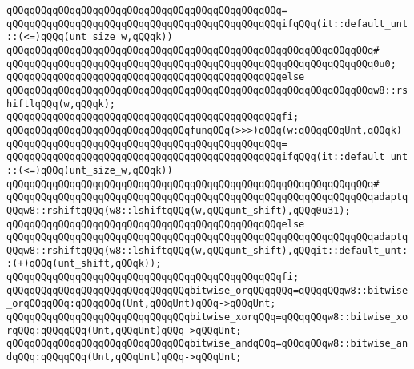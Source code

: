 \verb|qQQqqQQqqQQqqQQqqQQqqQQqqQQqqQQqqQQqqQQqqQQqqQQq=|\newline
\verb|qQQqqQQqqQQqqQQqqQQqqQQqqQQqqQQqqQQqqQQqqQQqqQQqifqQQq(it::default_unt::(<=)qQQq(unt_size_w,qQQqk))|\newline
\verb|qQQqqQQqqQQqqQQqqQQqqQQqqQQqqQQqqQQqqQQqqQQqqQQqqQQqqQQqqQQqqQQq#|\newline
\verb|qQQqqQQqqQQqqQQqqQQqqQQqqQQqqQQqqQQqqQQqqQQqqQQqqQQqqQQqqQQqqQQq0u0;|\newline
\verb|qQQqqQQqqQQqqQQqqQQqqQQqqQQqqQQqqQQqqQQqqQQqqQQqelse|\newline
\verb|qQQqqQQqqQQqqQQqqQQqqQQqqQQqqQQqqQQqqQQqqQQqqQQqqQQqqQQqqQQqqQQqw8::rshiftlqQQq(w,qQQqk);|\newline
\verb|qQQqqQQqqQQqqQQqqQQqqQQqqQQqqQQqqQQqqQQqqQQqqQQqfi;|\newline
\newline
\verb|qQQqqQQqqQQqqQQqqQQqqQQqqQQqqQQqfunqQQq(>>>)qQQq(w:qQQqqQQqUnt,qQQqk)|\newline
\verb|qQQqqQQqqQQqqQQqqQQqqQQqqQQqqQQqqQQqqQQqqQQqqQQq=|\newline
\verb|qQQqqQQqqQQqqQQqqQQqqQQqqQQqqQQqqQQqqQQqqQQqqQQqifqQQq(it::default_unt::(<=)qQQq(unt_size_w,qQQqk))|\newline
\verb|qQQqqQQqqQQqqQQqqQQqqQQqqQQqqQQqqQQqqQQqqQQqqQQqqQQqqQQqqQQqqQQq#|\newline
\verb|qQQqqQQqqQQqqQQqqQQqqQQqqQQqqQQqqQQqqQQqqQQqqQQqqQQqqQQqqQQqqQQqadaptqQQqw8::rshiftqQQq(w8::lshiftqQQq(w,qQQqunt_shift),qQQq0u31);|\newline
\verb|qQQqqQQqqQQqqQQqqQQqqQQqqQQqqQQqqQQqqQQqqQQqqQQqelse|\newline
\verb|qQQqqQQqqQQqqQQqqQQqqQQqqQQqqQQqqQQqqQQqqQQqqQQqqQQqqQQqqQQqqQQqadaptqQQqw8::rshiftqQQq(w8::lshiftqQQq(w,qQQqunt_shift),qQQqit::default_unt::(+)qQQq(unt_shift,qQQqk));|\newline
\verb|qQQqqQQqqQQqqQQqqQQqqQQqqQQqqQQqqQQqqQQqqQQqqQQqfi;|\newline
\newline
\verb|qQQqqQQqqQQqqQQqqQQqqQQqqQQqqQQqbitwise_orqQQqqQQq=qQQqqQQqw8::bitwise_orqQQqqQQq:qQQqqQQq(Unt,qQQqUnt)qQQq->qQQqUnt;|\newline
\verb|qQQqqQQqqQQqqQQqqQQqqQQqqQQqqQQqbitwise_xorqQQq=qQQqqQQqw8::bitwise_xorqQQq:qQQqqQQq(Unt,qQQqUnt)qQQq->qQQqUnt;|\newline
\verb|qQQqqQQqqQQqqQQqqQQqqQQqqQQqqQQqbitwise_andqQQq=qQQqqQQqw8::bitwise_andqQQq:qQQqqQQq(Unt,qQQqUnt)qQQq->qQQqUnt;|\newline
